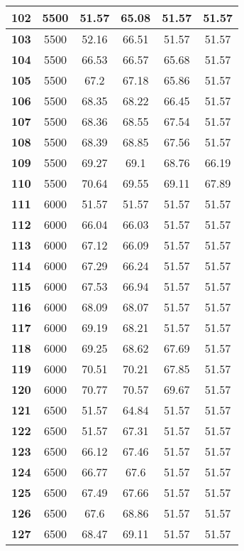 \begin{longtable}{|c|c|c|c|c|c|}
\textbf{102} & 5500 & 51.57 & 65.08 & 51.57 & 51.57 \\ \hline 
\textbf{103} & 5500 & 52.16 & 66.51 & 51.57 & 51.57 \\ \hline 
\textbf{104} & 5500 & 66.53 & 66.57 & 65.68 & 51.57 \\ \hline 
\textbf{105} & 5500 & 67.2 & 67.18 & 65.86 & 51.57 \\ \hline 
\textbf{106} & 5500 & 68.35 & 68.22 & 66.45 & 51.57 \\ \hline 
\textbf{107} & 5500 & 68.36 & 68.55 & 67.54 & 51.57 \\ \hline 
\textbf{108} & 5500 & 68.39 & 68.85 & 67.56 & 51.57 \\ \hline 
\textbf{109} & 5500 & 69.27 & 69.1 & 68.76 & 66.19 \\ \hline 
\textbf{110} & 5500 & 70.64 & 69.55 & 69.11 & 67.89 \\ \hline 
\textbf{111} & 6000 & 51.57 & 51.57 & 51.57 & 51.57 \\ \hline 
\textbf{112} & 6000 & 66.04 & 66.03 & 51.57 & 51.57 \\ \hline 
\textbf{113} & 6000 & 67.12 & 66.09 & 51.57 & 51.57 \\ \hline 
\textbf{114} & 6000 & 67.29 & 66.24 & 51.57 & 51.57 \\ \hline 
\textbf{115} & 6000 & 67.53 & 66.94 & 51.57 & 51.57 \\ \hline 
\textbf{116} & 6000 & 68.09 & 68.07 & 51.57 & 51.57 \\ \hline 
\textbf{117} & 6000 & 69.19 & 68.21 & 51.57 & 51.57 \\ \hline 
\textbf{118} & 6000 & 69.25 & 68.62 & 67.69 & 51.57 \\ \hline 
\textbf{119} & 6000 & 70.51 & 70.21 & 67.85 & 51.57 \\ \hline 
\textbf{120} & 6000 & 70.77 & 70.57 & 69.67 & 51.57 \\ \hline 
\textbf{121} & 6500 & 51.57 & 64.84 & 51.57 & 51.57 \\ \hline 
\textbf{122} & 6500 & 51.57 & 67.31 & 51.57 & 51.57 \\ \hline 
\textbf{123} & 6500 & 66.12 & 67.46 & 51.57 & 51.57 \\ \hline 
\textbf{124} & 6500 & 66.77 & 67.6 & 51.57 & 51.57 \\ \hline 
\textbf{125} & 6500 & 67.49 & 67.66 & 51.57 & 51.57 \\ \hline 
\textbf{126} & 6500 & 67.6 & 68.86 & 51.57 & 51.57 \\ \hline 
\textbf{127} & 6500 & 68.47 & 69.11 & 51.57 & 51.57 \\ \hline 

\end{longtable}
